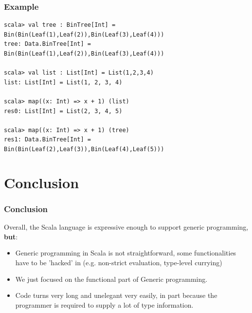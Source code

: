 \documentclass[10pt]{beamer}
\begin{document}
\begin{frame}[fragile]
\frametitle{Example}
\begin{lstlisting}[basicstyle=\ttfamily\scriptsize,mathescape]
scala> val tree : BinTree[Int] = Bin(Bin(Leaf(1),Leaf(2)),Bin(Leaf(3),Leaf(4)))
tree: Data.BinTree[Int] = Bin(Bin(Leaf(1),Leaf(2)),Bin(Leaf(3),Leaf(4)))

scala> val list : List[Int] = List(1,2,3,4)
list: List[Int] = List(1, 2, 3, 4)

scala> map((x: Int) => x + 1) (list)
res0: List[Int] = List(2, 3, 4, 5)

scala> map((x: Int) => x + 1) (tree)
res1: Data.BinTree[Int] = Bin(Bin(Leaf(2),Leaf(3)),Bin(Leaf(4),Leaf(5)))

\end{lstlisting}
\end{frame}

\section{Conclusion}

\begin{frame}
\frametitle{Conclusion}
Overall, the Scala language is expressive enough to support generic programming, \textbf{but}:
\begin{itemize}
\item Generic programming in Scala is not straightforward, some functionalities have to be 'hacked' in (e.g. non-strict evaluation, type-level currying)
\item We just focused on the functional part of Generic programming.
\item Code turns very long and unelegant very easily, in part because the programmer is required to supply a lot of type information.
\end{itemize}
\end{frame}
\end{document}
